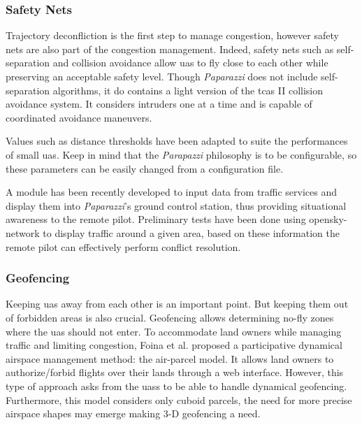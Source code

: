 	\subsubsection{Safety Nets}
		Trajectory deconfliction is the first step to manage congestion, however safety nets are also part of the congestion management. Indeed, safety nets such as self-separation and collision avoidance allow \gls{uas} to fly close to each other while preserving an acceptable safety level.
		Though \emph{Paparazzi} does not include self-separation algorithms, it do contains a light version of the \gls{tcas} II collision avoidance system. It considers intruders one at a time and is capable of coordinated avoidance maneuvers. 

		Values such as distance thresholds have been adapted to suite the performances of small \gls{uas}. 
		Keep in mind that the \emph{Parapazzi} philosophy is to be configurable, so these parameters can be easily changed from a configuration file.

	A module has been recently developed to input data from traffic services and display them into \emph{Paparazzi}'s ground control station, thus providing situational awareness to the remote pilot. Preliminary tests have been done using opensky-network to display traffic around a given area, based on these information the remote pilot can effectively perform conflict resolution.

	\subsubsection{Geofencing}
		Keeping \gls{uas} away from each other is an important point. But keeping them out of forbidden areas is also crucial.	Geofencing allows determining no-fly zones where the \gls{uas} should not enter.
		To accommodate land owners while managing traffic and limiting congestion, Foina et al. \cite{foina_air_parcelle_2015} proposed a participative dynamical airspace management method: the air-parcel model. It allows land owners to authorize/forbid flights over their lands through a web interface. 
		However, this type of approach asks from the \gls{uas}s to be able to handle dynamical geofencing. Furthermore, this model considers only cuboid parcels, the need for more precise airspace shapes may emerge making 3-D geofencing a need.
		
